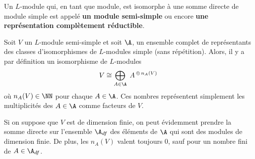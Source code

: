 \begin{Def} Un $L$-module qui, en tant que module, est isomorphe à une somme directe de module simple est appelé \textbf{un module semi-simple} ou encore \textbf{une représentation complètement réductible}.  
\end{Def}

Soit $V$ un $L$-module semi-simple et soit $\A$, un ensemble complet de représentants des classes d'isomorphismes de $L$-modules simple (sans répétition). Alors, il y a par définition un isomorphisme de $L$-modules
$$ V \cong \bigoplus_{A \in \A} \; A^{\,\oplus\, n_A(V)} $$
où $n_A(V) \in \NN$ pour chaque $A \in \A$. Ces nombres représentent simplement les multiplicités des $A \in \A$ comme facteurs de $V$. 

\begin{Rem} Si on suppose que $V$ est de dimension finie, on peut évidemment prendre la somme directe sur l'ensemble $\A_{df}$ des éléments de $\A$ qui sont des modules de dimension finie. De plus, les $n_A(V)$ valent toujours 0, sauf pour un nombre fini de $A \in \A_{df}$.
\end{Rem}

